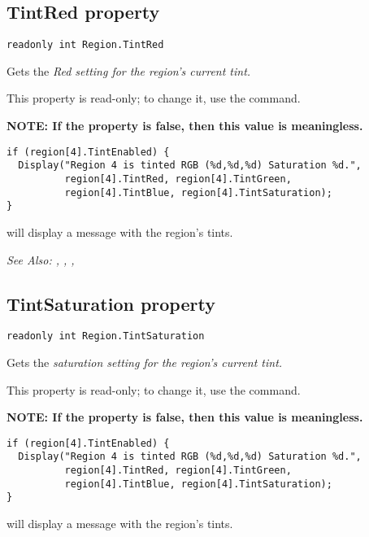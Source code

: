 \subsection{TintRed property}\label{Region.TintRed}%

\begin{verbatim}
readonly int Region.TintRed
\end{verbatim}
Gets the \it{Red} setting for the region's current tint.

This property is read-only; to change it, use the  command.

\bf{NOTE:} If the  property is false, then
this value is meaningless.

\begin{verbatim}
if (region[4].TintEnabled) {
  Display("Region 4 is tinted RGB (%d,%d,%d) Saturation %d.",
          region[4].TintRed, region[4].TintGreen,
          region[4].TintBlue, region[4].TintSaturation);
}
\end{verbatim}
will display a message with the region's tints.

\it{See Also:} , ,
, 


\subsection{TintSaturation property}\label{Region.TintSaturation}%

\begin{verbatim}
readonly int Region.TintSaturation
\end{verbatim}
Gets the \it{saturation} setting for the region's current tint.

This property is read-only; to change it, use the  command.

\bf{NOTE:} If the  property is false, then
this value is meaningless.

\begin{verbatim}
if (region[4].TintEnabled) {
  Display("Region 4 is tinted RGB (%d,%d,%d) Saturation %d.",
          region[4].TintRed, region[4].TintGreen,
          region[4].TintBlue, region[4].TintSaturation);
}
\end{verbatim}
will display a message with the region's tints.

